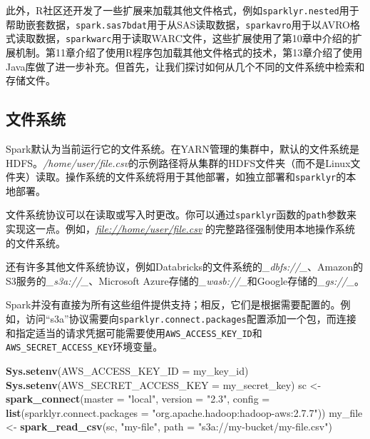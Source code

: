 \documentclass[
]{article}
\newenvironment{Shaded}{\begin{snugshade}}{\end{snugshade}}
\newcommand{\DataTypeTok}[1]{\textcolor[rgb]{0.13,0.29,0.53}{#1}}
\newcommand{\KeywordTok}[1]{\textcolor[rgb]{0.13,0.29,0.53}{\textbf{#1}}}
\newcommand{\NormalTok}[1]{#1}
\newcommand{\StringTok}[1]{\textcolor[rgb]{0.31,0.60,0.02}{#1}}
\begin{document}
此外，R社区还开发了一些扩展来加载其他文件格式，例如\texttt{sparklyr.nested}用于帮助嵌套数据，\texttt{spark.sas7bdat}用于从SAS读取数据，\texttt{sparkavro}用于以AVRO格式读取数据，\texttt{sparkwarc}用于读取WARC文件，这些扩展使用了第10章中介绍的扩展机制。第11章介绍了使用R程序包加载其他文件格式的技术，第13章介绍了使用Java库做了进一步补充。但首先，让我们探讨如何从几个不同的文件系统中检索和存储文件。

\hypertarget{ux6587ux4ef6ux7cfbux7edf}{%
\subsection{文件系统}\label{ux6587ux4ef6ux7cfbux7edf}}

Spark默认为当前运行它的文件系统。在YARN管理的集群中，默认的文件系统是HDFS。\emph{/home/user/file.csv}的示例路径将从集群的HDFS文件夹（而不是Linux文件夹）读取。操作系统的文件系统将用于其他部署，如独立部署和\texttt{sparklyr}的本地部署。

文件系统协议可以在读取或写入时更改。你可以通过\texttt{sparklyr}函数的\texttt{path}参数来实现这一点。例如，\emph{\url{file://home/user/file.csv}}
的完整路径强制使用本地操作系统的文件系统。

还有许多其他文件系统协议，例如Databricks的文件系统的\emph{\_dbfs://\_}、Amazon的S3服务的\emph{\_s3a://\_}、Microsoft
Azure存储的\emph{\_wasb://\_}和Google存储的\emph{\_gs://\_}。

Spark并没有直接为所有这些组件提供支持；相反，它们是根据需要配置的。例如，访问``s3a''协议需要向\texttt{sparklyr.connect.packages}配置添加一个包，而连接和指定适当的请求凭据可能需要使用\texttt{AWS\_ACCESS\_KEY\_ID}和
\texttt{AWS\_SECRET\_ACCESS\_KEY}环境变量。

\begin{Shaded}
\begin{Highlighting}[]
\KeywordTok{Sys.setenv}\NormalTok{(}\DataTypeTok{AWS_ACCESS_KEY_ID =}\NormalTok{ my_key_id)}
\KeywordTok{Sys.setenv}\NormalTok{(}\DataTypeTok{AWS_SECRET_ACCESS_KEY =}\NormalTok{ my_secret_key)}
\NormalTok{sc <-}\StringTok{ }\KeywordTok{spark_connect}\NormalTok{(}\DataTypeTok{master =} \StringTok{"local"}\NormalTok{, }\DataTypeTok{version =} \StringTok{"2.3"}\NormalTok{, }\DataTypeTok{config =} \KeywordTok{list}\NormalTok{(}\DataTypeTok{sparklyr.connect.packages =} \StringTok{"org.apache.hadoop:hadoop-aws:2.7.7"}\NormalTok{))}
\NormalTok{my_file <-}\StringTok{ }\KeywordTok{spark_read_csv}\NormalTok{(sc, }\StringTok{"my-file"}\NormalTok{, }\DataTypeTok{path =} \StringTok{"s3a://my-bucket/my-file.csv"}\NormalTok{)}
\end{Highlighting}
\end{Shaded}
\end{document}

